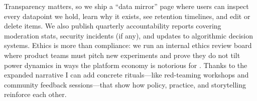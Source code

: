 Transparency matters, so we ship a ``data mirror'' page where users can inspect every datapoint we hold, learn why it exists, see retention timelines, and edit or delete items. We also publish quarterly accountability reports covering moderation stats, security incidents (if any), and updates to algorithmic decision systems. Ethics is more than compliance: we run an internal ethics review board where product teams must pitch new experiments and prove they do not tilt power dynamics in ways the platform economy is notorious for \citep{Choudary2016}. Thanks to the expanded narrative I can add concrete rituals---like red-teaming workshops and community feedback sessions---that show how policy, practice, and storytelling reinforce each other.
